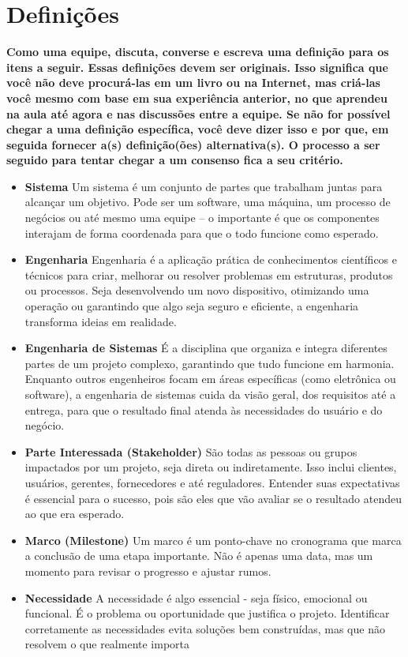 \documentclass[a4paper,12pt]{report}
\begin{document}
\section{Definições}
\textbf{Como uma equipe, discuta, converse e escreva uma definição para os itens a seguir. Essas
definições devem ser originais. Isso significa que você não deve procurá-las em um livro ou na
Internet, mas criá-las você mesmo com base em sua experiência anterior, no que aprendeu na aula
até agora e nas discussões entre a equipe. Se não for possível chegar a uma definição específica,
você deve dizer isso e por que, em seguida fornecer a(s) definição(ões) alternativa(s). O processo a ser seguido para tentar chegar a um consenso fica a seu critério.}
\begin{itemize}
    \item \textbf{Sistema}
Um sistema é um conjunto de partes que trabalham juntas para alcançar um objetivo. Pode ser um software, uma máquina, um processo de negócios ou até mesmo uma equipe – o importante é que os componentes interajam de forma coordenada para que o todo funcione como esperado. 
\item \textbf{Engenharia}
Engenharia é a aplicação prática de conhecimentos científicos e técnicos para criar, melhorar ou resolver problemas em estruturas, produtos ou processos. Seja desenvolvendo um novo dispositivo, otimizando uma operação ou garantindo que algo seja seguro e eficiente, a engenharia transforma ideias em realidade.  
\item \textbf{Engenharia de Sistemas}
É a disciplina que organiza e integra diferentes partes de um projeto complexo, garantindo que tudo funcione em harmonia. Enquanto outros engenheiros focam em áreas específicas (como eletrônica ou software), a engenharia de sistemas cuida da visão geral, dos requisitos até a entrega, para que o resultado final atenda às necessidades do usuário e do negócio.  
\item 
\textbf{Parte Interessada (Stakeholder)}  
São todas as pessoas ou grupos impactados por um projeto, seja direta ou indiretamente. Isso inclui clientes, usuários, gerentes, fornecedores e até reguladores. Entender suas expectativas é essencial para o sucesso, pois são eles que vão avaliar se o resultado atendeu ao que era esperado.  
\item \textbf{Marco (Milestone)}
Um marco é um ponto-chave no cronograma que marca a conclusão de uma etapa importante. Não é apenas uma data, mas um momento para revisar o progresso e ajustar rumos.
\item \textbf{Necessidade}
A necessidade é algo essencial - seja físico, emocional ou funcional.
É o problema ou oportunidade que justifica o projeto. Identificar corretamente as necessidades evita soluções bem construídas, mas que não resolvem o que realmente importa
\end{itemize}
\end{document}

